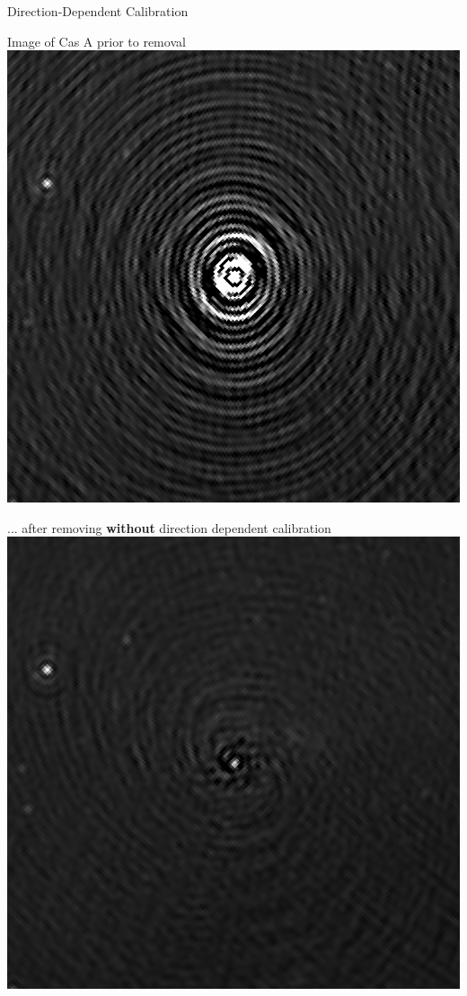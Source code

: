 \documentclass{beamer}
\begin{document}
\begin{frame}{Direction-Dependent Calibration}
    \begin{overprint}
        \begin{center}
            Image of Cas A prior to removal \\
            \vskip 10pt
            \includegraphics[height=0.6\textheight]{figures/cas-a-no-removal}
        \end{center}
        \begin{center}
            ... after removing \textbf{without} direction dependent calibration \\
            \vskip 10pt
            \includegraphics[height=0.6\textheight]{figures/cas-a-subtraction}

\end{center}
\end{overprint}
\end{frame}
\end{document}
